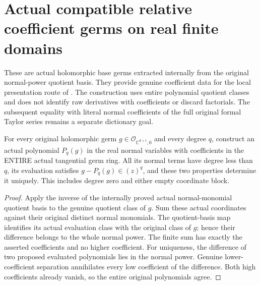 \section{Actual compatible relative coefficient germs on real finite domains}

These are actual holomorphic base germs extracted internally from the
original normal-power quotient basis. They provide genuine coefficient
data for the local presentation route of
\cite[Theorem 9.4, pp.~277--278]{bierstone-milman97-invent-math}.
The construction uses entire polynomial quotient classes and does not
identify raw derivatives with coefficients or discard factorials. The
subsequent equality with literal normal coefficients of the full original
formal Taylor series remains a separate dictionary goal.

\begin{theorem}
\label{hir:actual-relative-coefficient-polynomial-truncations}
\leanok
For every original holomorphic germ $g\in\mathcal O_{\mathbb C^{d+t},0}$
and every degree $q$, construct an actual polynomial $P_q(g)$ in the real
normal variables with coefficients in the ENTIRE actual tangential germ
ring. All its normal terms have degree less than $q$, its evaluation
satisfies $g-P_q(g)\in(z)^q$, and these two properties determine it uniquely.
This includes degree zero and either empty coordinate block.
\end{theorem}
\begin{proof}
Apply the inverse of the internally proved actual normal-monomial quotient
basis to the genuine quotient class of $g$. Sum these actual coordinates
against their original distinct normal monomials. The quotient-basis map
identifies its actual evaluation class with the original class of $g$;
hence their difference belongs to the whole normal power. The finite sum
has exactly the asserted coefficients and no higher coefficient. For
uniqueness, the difference of two proposed evaluated polynomials lies in
the normal power. Genuine lower-coefficient separation annihilates every
low coefficient of the difference. Both high coefficients already vanish,
so the entire original polynomials agree.
\end{proof}

